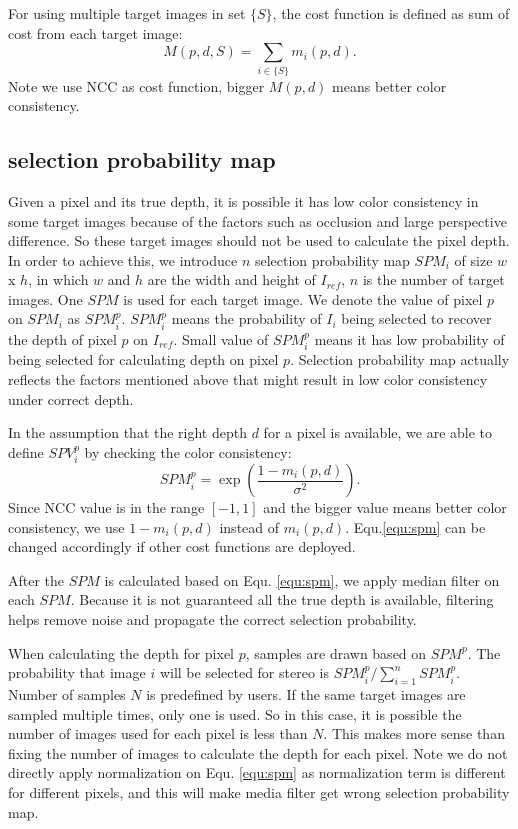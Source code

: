 For using multiple target images in set $\{S\}$, the cost function is defined as sum of cost from each target image:
\begin{equation}
    M(p,d,{S}) = \sum_{i\in{\{S\}}}{m_i(p,d)}.\label{equ:totalcost}
\end{equation}
Note we use NCC as cost function, bigger $M(p,d)$ means better color consistency.

\subsection{selection probability map} \label{subsec:spm}
Given a pixel and its true depth, it is possible it has low color consistency in some target images because of the factors such as occlusion and large perspective difference. So these target images should not be used to calculate the pixel depth. In order to achieve this, we introduce $n$ selection probability map $SPM_i$ of size $w$ x $h$, in which $w$ and $h$ are the width and height of $I_{ref}$, $n$ is the number of target images. One $SPM$ is used for each target image. We denote the value of pixel $p$ on $SPM_i$ as $SPM^p_i$. $SPM^p_i$ means the probability of $I_i$ being selected to recover the depth of pixel $p$ on $I_{ref}$. Small value of $SPM^p_i$ means it has low probability of being selected for calculating depth on pixel $p$. Selection probability map actually reflects the factors mentioned above that might result in low color consistency under correct depth.

In the assumption that the right depth $d$ for a pixel is available, we are able to define $SPV^p_i$ by checking the color consistency: 
\begin{equation}
    SPM^p_i = \exp(\frac{1 - m_i(p,d)}{\sigma^2}).\label{equ:spm}
\end{equation}
Since NCC value is in the range $[-1, 1]$ and the bigger value means better color consistency, we use $1 - m_i(p,d)$ instead of $m_i(p,d)$. Equ.\ref{equ:spm} can be changed accordingly if other cost functions are deployed. 

After the $SPM$ is calculated based on Equ. \ref{equ:spm}, we apply median filter on each $SPM$. Because it is not guaranteed all the true depth is available, filtering helps remove noise and propagate the correct selection probability.

When calculating the depth for pixel $p$, samples are drawn based on $SPM^p$. The probability that image $i$ will be selected for stereo is $SPM^p_i/\sum_{i = 1}^n{SPM^p_i}$. Number of samples $N$ is predefined by users. If the same target images are sampled multiple times, only one is used. So in this case, it is possible the number of images used for each pixel is less than $N$. This makes more sense than fixing the number of images to calculate the depth for each pixel. Note we do not directly apply normalization on Equ. \ref{equ:spm} as normalization term is different for different pixels, and this will make media filter get wrong selection probability map.

